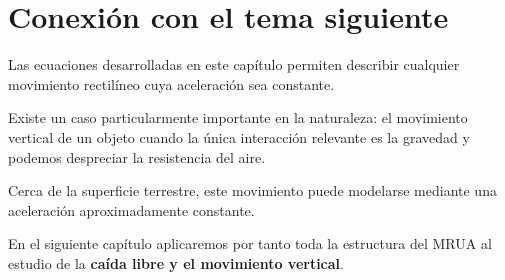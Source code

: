 \section{Conexión con el tema siguiente}

Las ecuaciones desarrolladas en este capítulo permiten describir cualquier
movimiento rectilíneo cuya aceleración sea constante.

Existe un caso particularmente importante en la naturaleza: el movimiento
vertical de un objeto cuando la única interacción relevante es la gravedad
y podemos despreciar la resistencia del aire.

Cerca de la superficie terrestre, este movimiento puede modelarse mediante
una aceleración aproximadamente constante.

En el siguiente capítulo aplicaremos por tanto toda la estructura del MRUA
al estudio de la \textbf{caída libre y el movimiento vertical}.


